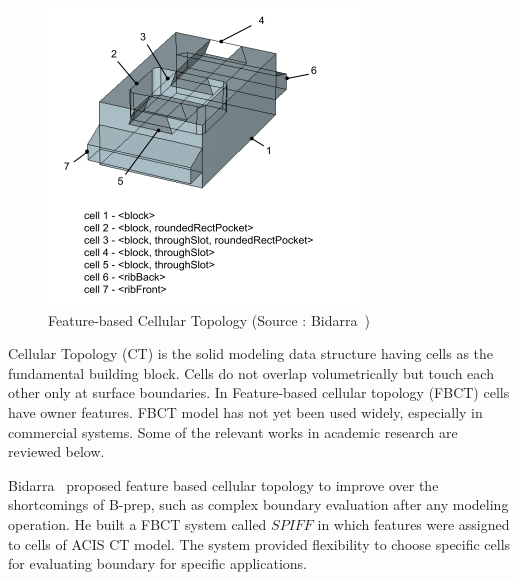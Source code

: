  
 \begin{figure}[!h]
\centering     %
\includegraphics[width=0.62\linewidth,valign=t]{images/fbct}
\caption{Feature-based Cellular Topology (Source : Bidarra~\cite{Bidarra2003a})}
\label{fig:litsurvey:fbct}
\end{figure}



Cellular Topology (CT) is the solid modeling data structure having cells as the fundamental building block. Cells do not overlap volumetrically but touch each other only at surface boundaries. In Feature-based cellular topology (FBCT) cells have owner features. FBCT model has not yet been used widely, especially in commercial systems. Some of the relevant works in academic research are reviewed below. 

Bidarra~\cite{Bidarra1993, Bidarra1997, BidarraKrakerBronsvoort1998} proposed feature based cellular topology to improve over the shortcomings of B-prep, such as complex boundary evaluation after any modeling operation. He built a FBCT system called $SPIFF$ in which features were assigned to cells of ACIS CT model. The system provided flexibility to choose specific cells for evaluating boundary for specific applications.

